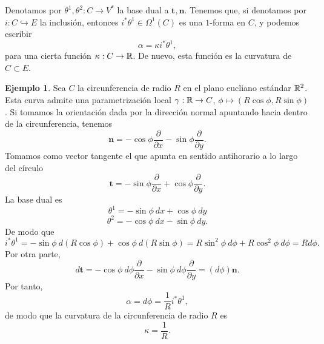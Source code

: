 \documentclass[11pt,a4paper]{amsbook}
\theoremstyle{remark} \newtheorem{rmk}[subsection]{Observación}
\theoremstyle{definition} \newtheorem{defn}[subsection]{Definición}
\theoremstyle{definition} \newtheorem{ex}[subsection]{Ejemplo}
\theoremstyle{definition} \newtheorem{ej}[subsection]{Ejercicio}
\begin{document}
Denotamos por $\theta^1,\theta^2 :C\rightarrow V^*$ la base dual a $\bm{t},\bm{n}$. Tenemos que, si denotamos por $i:C\hookrightarrow E$  la inclusión, entonces $i^* \theta^1 \in \Omega^1(C)$ es una $1$-forma en $C$, y podemos escribir
\begin{equation*}
\alpha = \kappa i^* \theta^1,
\end{equation*}
para una cierta función $\kappa:C\rightarrow \mathbb R$. De nuevo, esta función es la curvatura de $C\subset E$.

\begin{ex}
  Sea $C$ la circunferencia de radio $R$ en el plano eucliano estándar $\mathbb R^2$. Esta curva admite una parametrización local $\gamma:\mathbb R\rightarrow C$, $\phi\mapsto (R\cos \phi, R\sin \phi)$. Si tomamos la orientación dada por la dirección normal apuntando hacia dentro de la circunferencia, tenemos
  \begin{equation*}
\bm{n} = -\cos \phi \frac{\partial}{\partial x} - \sin \phi \frac{\partial}{\partial y}.
  \end{equation*}
Tomamos como vector tangente el que apunta en sentido antihorario a lo largo del círculo
\begin{equation*}
\bm{t} = - \sin \phi \frac{\partial}{\partial x} + \cos \phi \frac{\partial}{\partial y}.
\end{equation*}
La base dual es
\begin{equation*}
\theta^1 = -\sin \phi\ d x + \cos \phi\ dy
\end{equation*}
\begin{equation*}
\theta^2 = -\cos \phi\ dx - \sin \phi\ dy.
\end{equation*}
De modo que
\begin{equation*}
i^* \theta^1  = -\sin{\phi}\ d(R\cos{\phi}) + \cos{\phi}\ d(R\sin{\phi}) = R \sin^2{\phi}\ d\phi + R \cos^2{\phi}\ d\phi = Rd\phi.
\end{equation*}
Por otra parte,
\begin{equation*}
d\bm{t} = -\cos \phi\ d\phi \frac{\partial}{\partial x} - \sin \phi\ d\phi \frac{\partial}{\partial y} = (d\phi) \bm{n}.
\end{equation*}
Por tanto,
\begin{equation*}
\alpha = d\phi = \frac{1}{R} i^* \theta^1,
\end{equation*}
de modo que la curvatura de la circunferencia de radio $R$ es
\begin{equation*}
\kappa = \frac{1}{R}.
\end{equation*}
\end{ex}
\end{document}
